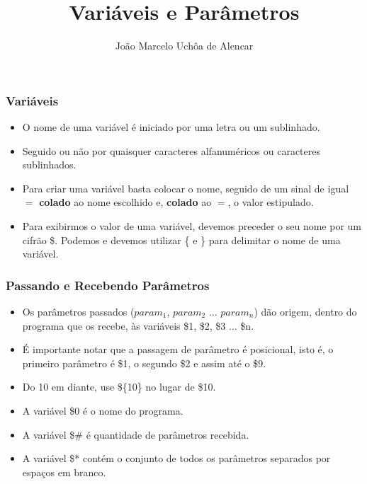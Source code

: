 \documentclass{beamer}
\title{Variáveis e Parâmetros}
\author[João Marcelo Uchôa de Alencar]{João Marcelo Uchôa de Alencar}
\institute{Universidade Federal do Ceará - Quixadá}
\begin{document}
   \begin{frame}
      \titlepage
   \end{frame}

   \begin{frame}
      \frametitle{Variáveis}
      \begin{itemize}
         \item O nome de uma variável é iniciado por uma letra ou um sublinhado.
         \item Seguido ou não por quaisquer caracteres alfanuméricos ou caracteres sublinhados.
         \item Para criar uma variável basta colocar o nome, seguido de um sinal de igual $=$ \textbf{colado} ao nome escolhido e, \textbf{colado} ao $=$, o valor estipulado.
	      \item Para exibirmos o valor de uma variável, devemos preceder o seu nome por um cifrão \$. Podemos e devemos utilizar \{ e \} para delimitar o nome de uma variável.
      \end{itemize}
   \end{frame}

   \begin{frame}
      \frametitle{Passando e Recebendo Parâmetros}
      \begin{itemize}
         \item Os parâmetros passados ($param_ {1}$, $param_ {2}$ ... $param_ {n}$) dão origem, dentro do programa que os recebe, às variáveis \$1, \$2, \$3 ... \$n.
         \item É importante notar que a passagem de parâmetro é posicional, isto é, o primeiro parâmetro é \$1, o segundo \$2 e assim até o \$9.
         \item Do 10 em diante, use \$\{10\} no lugar de \$10.
	      \item A variável \$0 é o nome do programa.
	      \item A variável \$\# é quantidade de parâmetros recebida.
	      \item A variável \$* contém o conjunto de todos os parâmetros separados por espaços em branco.
      \end{itemize}
   \end{frame}
\end{document}

